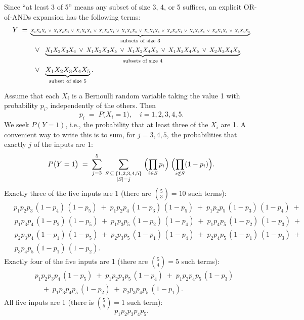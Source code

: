 Since ``at least 3 of 5'' means any subset of size 3, 4, or 5 suffices, an explicit OR-of-ANDs expansion has the following terms:
\begin{equation}
\begin{aligned}
Y \;=\;&
\underbrace{
  \resizebox{.90\hsize}{!}{$
    X_1 X_2 X_3 \;\lor\; X_1 X_2 X_4 \;\lor\; X_1 X_2 X_5 \;\lor\; X_1 X_3 X_4 \;\lor\; X_1 X_3 X_5 \;\lor\; X_1 X_4 X_5 \;\lor\; X_2 X_3 X_4 \;\lor\; X_2 X_3 X_5 \;\lor\; X_2 X_4 X_5 \;\lor\; X_3 X_4 X_5
  $}
}_{\text{subsets of size 3}}
\\
&\;\;\lor\;\;
\underbrace{
  \resizebox{.80\hsize}{!}{$
    X_1 X_2 X_3 X_4 \;\lor\; X_1 X_2 X_3 X_5 \;\lor\; X_1 X_2 X_4 X_5 \;\lor\; X_1 X_3 X_4 X_5 \;\lor\; X_2 X_3 X_4 X_5
  $}
}_{\text{subsets of size 4}}
\\
&\;\;\lor\;\;
\underbrace{X_1 X_2 X_3 X_4 X_5}_{\text{subset of size 5}}.
\end{aligned}
\end{equation}

Assume that each \(X_i\) is a Bernoulli random variable taking the value 1 with probability \(p_i\), independently of the others. Then
\[
p_i 
\;=\;
P\bigl(X_i = 1\bigr),
\quad
i = 1,2,3,4,5.
\]
We seek 
\(\displaystyle P(Y=1)\), i.e., the probability that at least three of the \(X_i\) are 1.  A convenient way to write this is to sum, for \(j=3,4,5\), the probabilities that exactly \(j\) of the inputs are 1:
\[
P\bigl(Y=1\bigr)
\;=\;
\sum_{j=3}^{5}
\;\sum_{\substack{S\,\subseteq\,\{1,2,3,4,5\}\\|S|=j}}
\;\Bigl(\prod_{i\in S} p_i\Bigr)\;
\Bigl(\prod_{i\notin S} (1 - p_i)\Bigr).
\]
Exactly three of the five inputs are 1 (there are \(\binom{5}{3} = 10\) such terms):
\[
\begin{aligned}
&\,p_1 p_2 p_3\,(1\!-\!p_4)\,(1\!-\!p_5)\;+\;
p_1 p_2 p_4\,(1\!-\!p_3)\,(1\!-\!p_5)\;+\;
p_1 p_2 p_5\,(1\!-\!p_3)\,(1\!-\!p_4)\;+\;
\\
&\;p_1 p_3 p_4\,(1\!-\!p_2)\,(1\!-\!p_5)\;+\;
p_1 p_3 p_5\,(1\!-\!p_2)\,(1\!-\!p_4)\;+\;
p_1 p_4 p_5\,(1\!-\!p_2)\,(1\!-\!p_3)\;+\;
\\
&\;p_2 p_3 p_4\,(1\!-\!p_1)\,(1\!-\!p_5)\;+\;
p_2 p_3 p_5\,(1\!-\!p_1)\,(1\!-\!p_4)\;+\;
p_2 p_4 p_5\,(1\!-\!p_1)\,(1\!-\!p_3)\;+\;
\\
&\;p_3 p_4 p_5\,(1\!-\!p_1)\,(1\!-\!p_2).
\end{aligned}
\]
Exactly four of the five inputs are 1 (there are \(\binom{5}{4}=5\) such terms):
\[
\begin{aligned}
&p_1 p_2 p_3 p_4\,(1\!-\!p_5)
\;+\;
p_1 p_2 p_3 p_5\,(1\!-\!p_4)
\;+\;
p_1 p_2 p_4 p_5\,(1\!-\!p_3)
\\
&\quad+\;
p_1 p_3 p_4 p_5\,(1\!-\!p_2)
\;+\;
p_2 p_3 p_4 p_5\,(1\!-\!p_1).
\end{aligned}
\]
All five inputs are 1 (there is \(\binom{5}{5}=1\) such term):
\[
p_1 p_2 p_3 p_4 p_5.
\]


